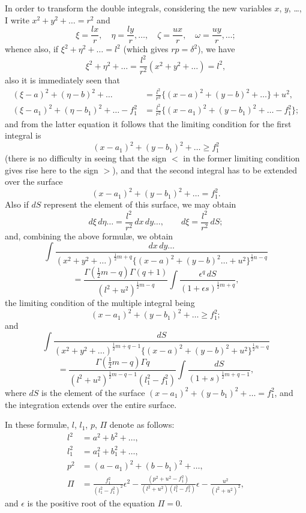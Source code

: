 \documentclass[11pt,a4paper]{book}
\begin{document}
\noindent In order to transform the double integrals, considering the new variables $x$, $y$, \ldots, I write $x^2+y^2+\ldots = r^2$ and
\[
\xi = \frac{lx}{r}, \quad \eta = \frac{ly}{r}, \ldots, \quad \zeta = \frac{ux}{r}, \quad \omega = \frac{uy}{r}, \ldots;
\]
whence also, if $\xi^2 + \eta^2 + \ldots = l^2$ (which gives $rp = \delta^2$), we have
\[
\xi^2 + \eta^2 + \ldots = \frac{l^2}{r^2}(x^2+y^2+\ldots) = l^2,
\]
also it is immediately seen that
\begin{align*}
(\xi-a)^2 + (\eta-b)^2 + \ldots &= \frac{l^2}{r^2}\{(x-a)^2 + (y-b)^2 + \ldots\} + u^2,\\
(\xi-a_1)^2 + (\eta-b_1)^2 + \ldots - f_1^2 &= \frac{l^2}{r^2}\{(x-a_1)^2 + (y-b_1)^2 + \ldots - f_1^2\};
\end{align*}
and from the latter equation it follows that the limiting condition for the first integral is
\[
(x-a_1)^2 + (y-b_1)^2 + \ldots \ge f_1^2
\]
(there is no difficulty in seeing that the sign $<$ in the former limiting condition gives rise here to the sign $>$), and that the second integral has to be extended over the surface
\[
(x-a_1)^2 + (y-b_1)^2 + \ldots = f_1^2.
\]
Also if $dS$ represent the element of this surface, we may obtain
\[
d\xi\, d\eta \ldots = \frac{l^2}{r^2}\, dx\, dy \ldots, \qquad d\xi = \frac{l^2}{r^2}\, dS;
\]
and, combining the above formul\ae, we obtain
\[
\int \frac{dx\, dy \ldots}{(x^2+y^2+\ldots)^{\frac{1}{2}m+q}\{(x-a)^2+(y-b)^2\ldots+u^2\}^{\frac{1}{2}n-q}}
\]
\[
= \frac{\Gamma(\frac{1}{2}m-q)\Gamma(q+1)}{(l^2+u^2)^{\frac{1}{2}m-q}} \int \frac{\epsilon^q \, dS}{(1+\epsilon s)^{\frac{1}{2}m+q}},
\]
the limiting condition of the multiple integral being
\[
(x-a_1)^2 + (y-b_1)^2 + \ldots \ge f_1^2;
\]
and
\[
\int \frac{dS}{(x^2+y^2+\ldots)^{\frac{1}{2}m+q-1}\{(x-a)^2+(y-b)^2+u^2\}^{\frac{1}{2}n-q}}
\]
\[
= \frac{\Gamma(\frac{1}{2}m-q)\Gamma q}{(l^2+u^2)^{\frac{1}{2}m-q-1}(l_1^2-f_1^2)} \int \frac{dS}{(1+s)^{\frac{1}{2}m+q-1}},
\]
where $dS$ is the element of the surface $(x-a_1)^2 + (y-b_1)^2 + \ldots = f_1^2$, and the integration extends over the entire surface.

In these formul\ae, $l$, $l_1$, $p$, $\Pi$ denote as follows:
\begin{align*}
l^2 &= a^2 + b^2 + \ldots,\\
l_1^2 &= a_1^2 + b_1^2 + \ldots,\\
p^2 &= (a-a_1)^2 + (b-b_1)^2 + \ldots,\\
\Pi &= \frac{f_1^2}{(l_1^2-f_1^2)^2} \epsilon^2 - \frac{(p^2+u^2-f_1^2)}{(l^2+u^2)(l_1^2-f_1^2)} \epsilon - \frac{u^2}{(l^2+u^2)^2},
\end{align*}
and $\epsilon$ is the positive root of the equation $\Pi = 0$.
\end{document}
